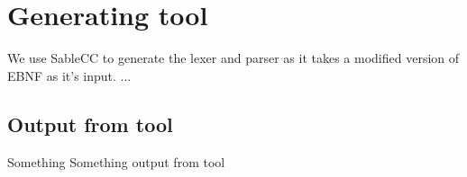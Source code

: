\chapter{Generating tool}

We use SableCC to generate the lexer and parser as it takes a modified version of EBNF as it's input. $\ldots$

\section{Output from tool}

Something Something output from tool